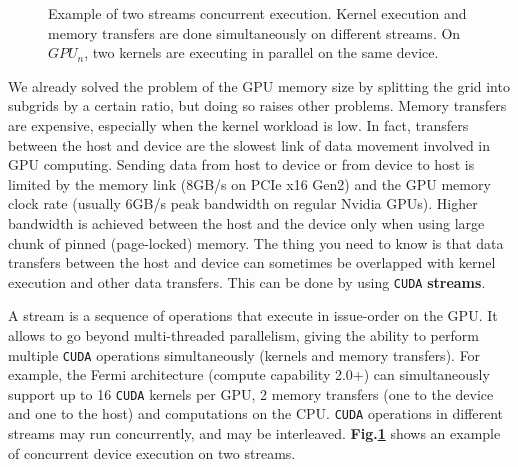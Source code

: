 \documentclass[12pt,journal,compsoc]{IEEEtran}
\begin{document}
\begin{figure}[!ht]
\centering
{}
\caption{Example of two streams concurrent execution. Kernel execution and memory transfers are done simultaneously on different streams. On $GPU_n$, two kernels are executing in parallel on the same device.}
\label{basic_streams}
\end{figure}


We already solved the problem of the GPU memory size by splitting the grid into subgrids by a certain ratio, but doing so raises other problems.
Memory transfers are expensive, especially when the kernel workload is low.
In fact, transfers between the host and device are the slowest link of data movement involved in GPU computing.
Sending data from host to device or from device to host is limited by the memory link (8GB/s on PCIe x16 Gen2) and the GPU memory clock rate (usually 6GB/s peak bandwidth on regular Nvidia GPUs).
Higher bandwidth is achieved between the host and the device only when using large chunk of pinned (page-locked) memory.
The thing you need to know is that data transfers between the host and device can sometimes be overlapped with kernel execution and other data transfers.
This can be done by using \texttt{CUDA} \textbf{streams}.\par
A stream is a sequence of operations that execute in issue-order on the GPU.
It allows to go beyond multi-threaded parallelism, giving the ability to perform multiple \texttt{CUDA} operations simultaneously (kernels and memory transfers).
For example, the Fermi architecture (compute capability 2.0+) can simultaneously support up to 16 \texttt{CUDA} kernels per GPU, 2 memory transfers (one to the device and one to the host) and computations on the CPU.
\texttt{CUDA} operations in different streams may run concurrently, and may be interleaved. \textbf{Fig.\ref{basic_streams}} shows an example of concurrent device execution on two streams.
\end{document}
